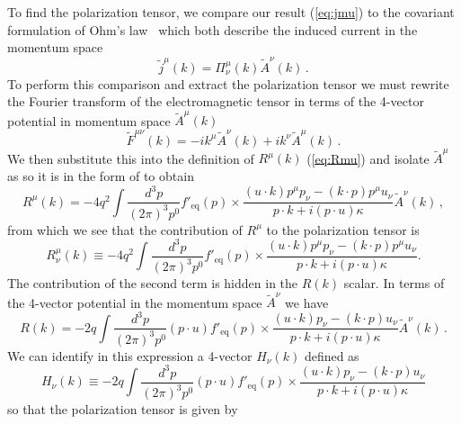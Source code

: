 To find the polarization tensor, we compare our result (\ref{eq:jmu}) to the covariant formulation of Ohm's law~\cite{Starke:2014tfa} which both describe the induced current in the momentum space
\begin{equation}\label{eq:ohm}
\widetilde{j}^\mu(k) = \Pi^\mu_\nu(k) \widetilde{A}^\nu(k)\,.
\end{equation}
To perform this comparison and extract the polarization tensor we must rewrite the Fourier transform of the electromagnetic tensor in terms of the 4-vector potential in momentum space $\widetilde{A}^\mu(k)$
\begin{equation}\label{eq:ftfmunu}
\widetilde{F}^{\mu\nu}(k) = -i k^\mu \widetilde{A}^\nu(k) + i k^\nu \widetilde{A}^\mu(k)\,.
\end{equation}
We then substitute this into the definition of $R^\mu(k)$ (\ref{eq:Rmu}) and isolate $\widetilde{A}^\mu$ as so it is in the form of  to obtain \cite{Formanek:2021blc}
\begin{equation}
R^\mu(k) = - 4q^2 \int \frac{d^3p}{(2\pi)^3p^0} f'_\mathrm{eq}(p)
\times \frac{(u\cdot k)p^\mu p_\nu - (k \cdot p)p^\mu u_\nu}{p\cdot k + i (p \cdot u) \kappa} \widetilde{A}^\nu(k)\,,
\end{equation}
from which we see that the contribution of $R^\mu$ to the polarization tensor is
\begin{equation}\label{eq:Rmunu}
R^\mu_\nu(k) \equiv - 4q^2 \int \frac{d^3p}{(2\pi)^3p^0} f'_\mathrm{eq}(p)
\times\frac{(u\cdot k)p^\mu p_\nu - (k \cdot p)p^\mu u_\nu}{p\cdot k + i (p \cdot u) \kappa}.
\end{equation}
The contribution of the second term is hidden in the $R(k)$ scalar. In terms of the 4-vector potential in the momentum space $\widetilde{A}^\nu$ we have
\begin{equation}
R(k) = - 2q \int \frac{d^3p}{(2\pi)^3p^0}(p \cdot u)f'_\mathrm{eq}(p)
\times\frac{(u\cdot k)p_\nu - (k \cdot p)u_\nu}{p\cdot k + i (p \cdot u) \kappa}\widetilde{A}^\nu(k)\,.
\end{equation}
We can identify in this expression a 4-vector $H_\nu(k)$ defined as
\begin{equation}\label{eq:Hnu}
H_\nu(k) \equiv - 2q \int \frac{d^3p}{(2\pi)^3p^0}(p \cdot u)f'_\mathrm{eq}(p)
\times\frac{(u\cdot k)p_\nu - (k \cdot p)u_\nu}{p\cdot k + i (p \cdot u) \kappa}
\end{equation}
so that the polarization tensor is given by
